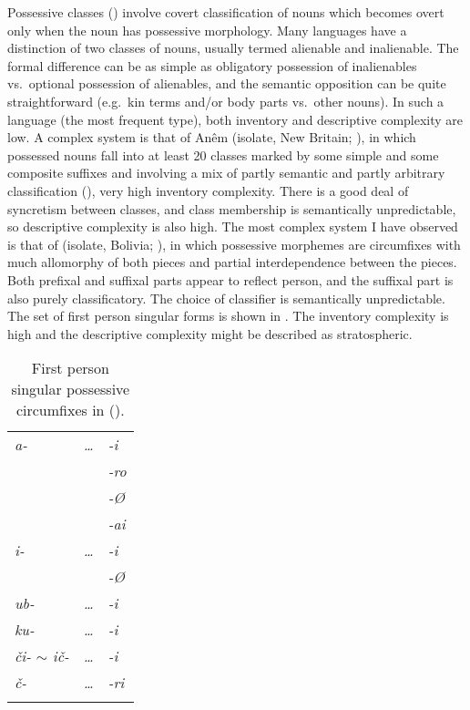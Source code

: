 \documentclass[output=collectionpaper]{langsci/langscibook}
\begin{document}
Possessive classes (\citealt{Nichols2013,Bickel2013a}) involve covert classification of nouns which becomes overt only when the noun has possessive morphology. Many languages have a distinction of two classes of nouns, usually termed alienable and inalienable. The formal difference can be as simple as obligatory possession of inalienables vs.\ optional possession of alienables, and the semantic opposition can be quite straightforward (e.g.\ kin terms and/or body parts vs.\ other nouns). In such a language (the most frequent type), both inventory and descriptive complexity are low. A complex system is that of Anêm (isolate, New Britain; \citealt{Thurston1982}), in which possessed nouns fall into at least 20 classes marked by some simple and some composite suffixes and involving a mix of partly semantic and partly arbitrary classification (\citealt[37--38]{Thurston1982}), very high inventory complexity. There is a good deal of syncretism between classes, and class membership is semantically unpredictable, so descriptive complexity is also high. The most complex system I have observed is that of  (isolate, Bolivia; \citealt{Key1967}), in which possessive morphemes are circumfixes with much allomorphy of both pieces and partial interdependence between the pieces. Both prefixal and suffixal parts appear to reflect person, and the suffixal part is also purely classificatory. The choice of classifier is semantically unpredictable. The set of first person singular forms is shown in . The inventory complexity is high and the descriptive complexity might be described as stratospheric.


\begin{table}
\caption{First person singular possessive circumfixes in  (\citealt{Key1967}).}
\label{extab:Nich:12}

\begin{tabularx}{.5\textwidth}{>{\itshape}X>{\itshape}X>{\itshape}l}
\lsptoprule
		a- & \ldots &	-i \\
			& & -ro \\
			& & -Ø	 \\
			 && -ai	 \\
		i-  & \ldots & 	-i	 \\
			 && -Ø	 \\
		ub-  & \ldots &	-i \\
		ku-  & \ldots & 	-i \\
		či- $\sim$ ič- & \ldots & -i		 \\
		č- & \ldots &	-ri	 \\
\lspbottomrule\end{tabularx}
\end{table}
\end{document}
